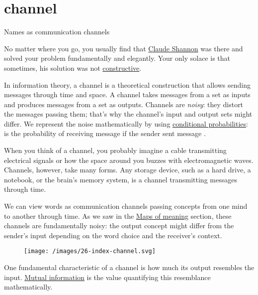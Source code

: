 \documentclass{article}
\begin{document}
\section{channel}{Names as communication channels}

No matter where you go, you usually find that \href{https://en.wikipedia.org/wiki/Claude_Shannon}{Claude Shannon} was there and solved your problem fundamentally and elegantly.
Your only solace is that sometimes, his solution was not \href{https://en.wikipedia.org/wiki/Constructive_proof}{constructive}.

In information theory,
a channel is a theoretical construction that allows sending messages through time and space.
A channel takes messages from a set  as inputs and produces messages from a set  as outputs.
Channels are \emph{noisy}:
they distort the messages passing them;
that's why the channel's input and output sets might differ.
We represent the noise mathematically by using \href{https://en.wikipedia.org/wiki/Conditional_probability}{conditional probabilities}:
is the probability of receiving message  if the sender sent message .

When you think of a channel,
you probably imagine a cable transmitting electrical signals or how the space around you buzzes with electromagnetic waves.
Channels, however, take many forms.
Any storage device,
such as a hard drive, a notebook, or the brain's memory system,
is a channel transmitting messages through time.

We can view words as communication channels passing concepts from one mind to another through time.
As we saw in the \href{#maps-of-meaning}{Maps of meaning} section,
these channels are fundamentally noisy:
the output concept might differ from the sender's input depending on the word choice and the receiver's context.

\begin{figure}[grayscale-diagram]
  \texttt{[image: /images/26-index-channel.svg]}
\end{figure}

One fundamental characteristic of a channel is how much its output resembles the input.
\href{https://en.wikipedia.org/wiki/Mutual_information}{Mutual information} is the value quantifying this resemblance mathematically.
\end{document}
